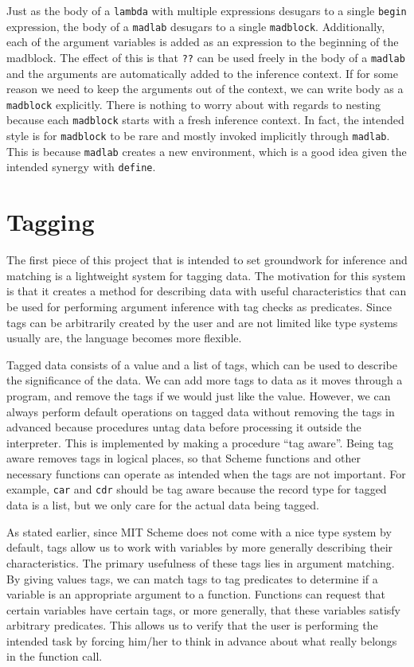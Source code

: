 \documentclass[11pt]{article}
\begin{document}
Just as the body of a \texttt{lambda} with multiple expressions
desugars to a single \texttt{begin} expression,
the body of a \texttt{madlab} desugars to a single \texttt{madblock}.
Additionally, each of the argument variables is added as an expression
to the beginning of the madblock.
The effect of this is that \texttt{??}
can be used freely in the body of a \texttt{madlab}
and the arguments are automatically added to the inference context.
If for some reason we need to keep the arguments out of the context,
we can write body as a \texttt{madblock} explicitly.
There is nothing to worry about with regards to nesting
because each \texttt{madblock} starts with a fresh inference context.
In fact, the intended style is for \texttt{madblock} to be rare
and mostly invoked implicitly through \texttt{madlab}.
This is because \texttt{madlab} creates a new environment,
which is a good idea given the intended synergy with \texttt{define}.


\section{Tagging}

The first piece of this project that is intended to set groundwork
for inference and matching is a lightweight system for tagging data.
The motivation for this system is that it creates a method for
describing data with useful characteristics that can be used for
performing argument inference with tag checks as predicates.
Since tags can be arbitrarily created by the user
and are not limited like type systems usually are,
the language becomes more flexible.

Tagged data consists of a value and a list of tags,
which can be used to describe the significance of the data.
We can add more tags to data as it moves through a program,
and remove the tags if we would just like the value.
However, we can always perform default operations on tagged data
without removing the tags in advanced because procedures
untag data before processing it outside the interpreter.
This is implemented by making a procedure ``tag aware''.
Being tag aware removes tags in logical places,
so that Scheme functions and other necessary functions
can operate as intended when the tags are not important.
For example, \texttt{car} and \texttt{cdr} should be tag aware because
the record type for tagged data is a list,
but we only care for the actual data being tagged.

As stated earlier, since MIT Scheme does not come
with a nice type system by default,
tags allow us to work with variables
by more generally describing their characteristics.
The primary usefulness of these tags lies in argument matching.
By giving values tags, we can match tags to tag predicates
to determine if a variable is an appropriate argument to a function.
Functions can request that certain variables have certain tags,
or more generally, that these variables satisfy arbitrary predicates.
This allows us to verify that the user is performing the intended task
by forcing him/her to think in advance about what really belongs
in the function call.
\end{document}
